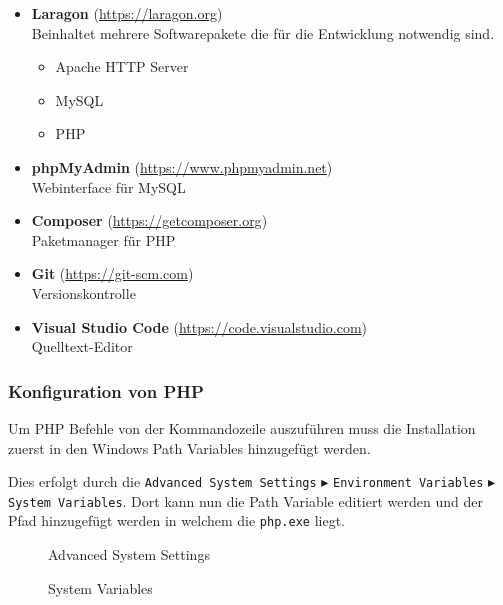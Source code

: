 \begin{itemize}
  \item \textbf{Laragon} (\url{https://laragon.org}) \\Beinhaltet mehrere
        Softwarepakete die für die Entwicklung notwendig sind.
        \begin{itemize}
          \item Apache HTTP Server
          \item MySQL
          \item PHP
        \end{itemize}
  \item \textbf{phpMyAdmin} (\url{https://www.phpmyadmin.net}) \\ Webinterface
        für MySQL
  \item \textbf{Composer} (\url{https://getcomposer.org}) \\ Paketmanager für
        PHP
  \item \textbf{Git} (\url{https://git-scm.com}) \\ Versionskontrolle
  \item \textbf{Visual Studio Code} (\url{https://code.visualstudio.com}) \\
        Quelltext-Editor
\end{itemize}


\subsubsection{Konfiguration von PHP}
Um PHP Befehle von der Kommandozeile auszuführen muss die Installation zuerst in
den Windows Path Variables hinzugefügt werden.

Dies erfolgt durch die \verb|Advanced System Settings| $\blacktriangleright$
\verb|Environment Variables| $\blacktriangleright$ \verb|System Variables|. Dort
kann nun die Path Variable editiert werden und der Pfad hinzugefügt werden in
welchem die \verb|php.exe| liegt.

\begin{figure}[H]
  \centering
  \caption{Advanced System Settings}
\end{figure}

\begin{figure}[H]
  \centering
  \caption{System Variables}
\end{figure}

